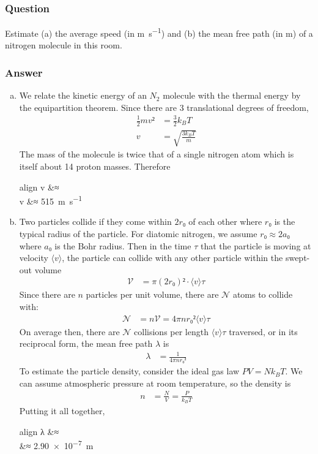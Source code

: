\subsubsection{Question}

Estimate (a) the average speed (in \si{\m\per\s}) and (b) the mean free path
(in \si{\m}) of a nitrogen molecule in this room.

\subsubsection{Answer}

\begin{enumerate}[(a)]
	\item
		We relate the kinetic energy of an $N_2$ molecule with the thermal
		energy by the equipartition theorem. Since there are 3 translational
		degrees of freedom,
		\begin{align*}
			\frac 12 mv² &= \frac 32 k_B T \\
			v &= \sqrt{\frac{3 k_B T}{m}}
		\end{align*}
		The mass of the molecule is twice that of a single nitrogen atom
		which is itself about 14 proton masses. Therefore
		\begin{empheq}[box=\fbox]{align}
			v &≈  \\
			v &≈ \SI{515}{\m\per\s}
		\end{empheq}
	\item
		Two particles collide if they come within $2r₀$ of each other where
		$r₀$ is the typical radius of the particle. For diatomic nitrogen,
		we assume $r₀ ≈ 2a₀$ where $a₀$ is the Bohr radius. Then in the time
		$τ$ that the particle is moving at velocity $⟨v⟩$, the particle can
		collide with any other particle within the swept-out volume
		\begin{align*}
			\mathcal V &= π(2r₀)² ⋅ ⟨v⟩τ
		\end{align*}
		Since there are $n$ particles per unit volume, there are $\mathcal N$
		atoms to collide with:
		\begin{align*}
			\mathcal N &= n\mathcal V = 4πn{r₀}² ⟨v⟩τ
		\end{align*}
		On average then, there are $\mathcal N$ collisions per length $⟨v⟩τ$
		traversed, or in its reciprocal form, the mean free path $λ$ is
		\begin{align*}
			λ &= \frac{1}{4πn{r₀}²}
		\end{align*}
		To estimate the particle density, consider the ideal gas law
		$PV=Nk_BT$. We can assume atmospheric pressure at room temperature,
		so the density is
		\begin{align*}
			n &= \frac N V = \frac{P}{k_B T}
		\end{align*}
		Putting it all together,
		\begin{empheq}[box=\fbox]{align}
			λ &≈  \\
			{}&≈ \SI{2.90e-7}{\m}
		\end{empheq}
\end{enumerate}
